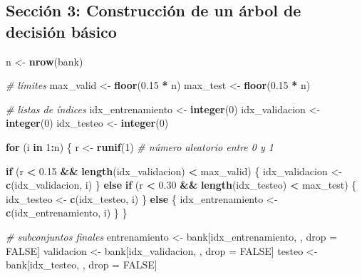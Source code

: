 \documentclass[
]{article}
\newenvironment{Shaded}{\begin{snugshade}}{\end{snugshade}}
\newcommand{\CommentTok}[1]{\textcolor[rgb]{0.56,0.35,0.01}{\textit{#1}}}
\newcommand{\ConstantTok}[1]{\textcolor[rgb]{0.56,0.35,0.01}{#1}}
\newcommand{\ControlFlowTok}[1]{\textcolor[rgb]{0.13,0.29,0.53}{\textbf{#1}}}
\newcommand{\DecValTok}[1]{\textcolor[rgb]{0.00,0.00,0.81}{#1}}
\newcommand{\FloatTok}[1]{\textcolor[rgb]{0.00,0.00,0.81}{#1}}
\newcommand{\FunctionTok}[1]{\textcolor[rgb]{0.13,0.29,0.53}{\textbf{#1}}}
\newcommand{\NormalTok}[1]{#1}
\newcommand{\OtherTok}[1]{\textcolor[rgb]{0.56,0.35,0.01}{#1}}
\newcommand{\SpecialCharTok}[1]{\textcolor[rgb]{0.81,0.36,0.00}{\textbf{#1}}}
\begin{document}
\subsection{Sección 3: Construcción de un árbol de decisión
básico}\label{secciuxf3n-3-construcciuxf3n-de-un-uxe1rbol-de-decisiuxf3n-buxe1sico}

\begin{Shaded}
\begin{Highlighting}[]
\NormalTok{n }\OtherTok{\textless{}{-}} \FunctionTok{nrow}\NormalTok{(bank)}

\CommentTok{\# límites}
\NormalTok{max\_valid }\OtherTok{\textless{}{-}} \FunctionTok{floor}\NormalTok{(}\FloatTok{0.15} \SpecialCharTok{*}\NormalTok{ n)}
\NormalTok{max\_test  }\OtherTok{\textless{}{-}} \FunctionTok{floor}\NormalTok{(}\FloatTok{0.15} \SpecialCharTok{*}\NormalTok{ n)}

\CommentTok{\# listas de índices}
\NormalTok{idx\_entrenamiento }\OtherTok{\textless{}{-}} \FunctionTok{integer}\NormalTok{(}\DecValTok{0}\NormalTok{)}
\NormalTok{idx\_validacion    }\OtherTok{\textless{}{-}} \FunctionTok{integer}\NormalTok{(}\DecValTok{0}\NormalTok{)}
\NormalTok{idx\_testeo        }\OtherTok{\textless{}{-}} \FunctionTok{integer}\NormalTok{(}\DecValTok{0}\NormalTok{)}

\ControlFlowTok{for}\NormalTok{ (i }\ControlFlowTok{in} \DecValTok{1}\SpecialCharTok{:}\NormalTok{n) \{}
\NormalTok{  r }\OtherTok{\textless{}{-}} \FunctionTok{runif}\NormalTok{(}\DecValTok{1}\NormalTok{)  }\CommentTok{\# número aleatorio entre 0 y 1}

  \ControlFlowTok{if}\NormalTok{ (r }\SpecialCharTok{\textless{}} \FloatTok{0.15} \SpecialCharTok{\&\&} \FunctionTok{length}\NormalTok{(idx\_validacion) }\SpecialCharTok{\textless{}}\NormalTok{ max\_valid) \{}
\NormalTok{    idx\_validacion }\OtherTok{\textless{}{-}} \FunctionTok{c}\NormalTok{(idx\_validacion, i)}
\NormalTok{  \} }\ControlFlowTok{else} \ControlFlowTok{if}\NormalTok{ (r }\SpecialCharTok{\textless{}} \FloatTok{0.30} \SpecialCharTok{\&\&} \FunctionTok{length}\NormalTok{(idx\_testeo) }\SpecialCharTok{\textless{}}\NormalTok{ max\_test) \{}
\NormalTok{    idx\_testeo }\OtherTok{\textless{}{-}} \FunctionTok{c}\NormalTok{(idx\_testeo, i)}
\NormalTok{  \} }\ControlFlowTok{else}\NormalTok{ \{}
\NormalTok{    idx\_entrenamiento }\OtherTok{\textless{}{-}} \FunctionTok{c}\NormalTok{(idx\_entrenamiento, i)}
\NormalTok{  \}}
\NormalTok{\}}

\CommentTok{\# subconjuntos finales}
\NormalTok{entrenamiento }\OtherTok{\textless{}{-}}\NormalTok{ bank[idx\_entrenamiento, , drop }\OtherTok{=} \ConstantTok{FALSE}\NormalTok{]}
\NormalTok{validacion    }\OtherTok{\textless{}{-}}\NormalTok{ bank[idx\_validacion,    , drop }\OtherTok{=} \ConstantTok{FALSE}\NormalTok{]}
\NormalTok{testeo        }\OtherTok{\textless{}{-}}\NormalTok{ bank[idx\_testeo,        , drop }\OtherTok{=} \ConstantTok{FALSE}\NormalTok{]}
\end{Highlighting}
\end{Shaded}
\end{document}
